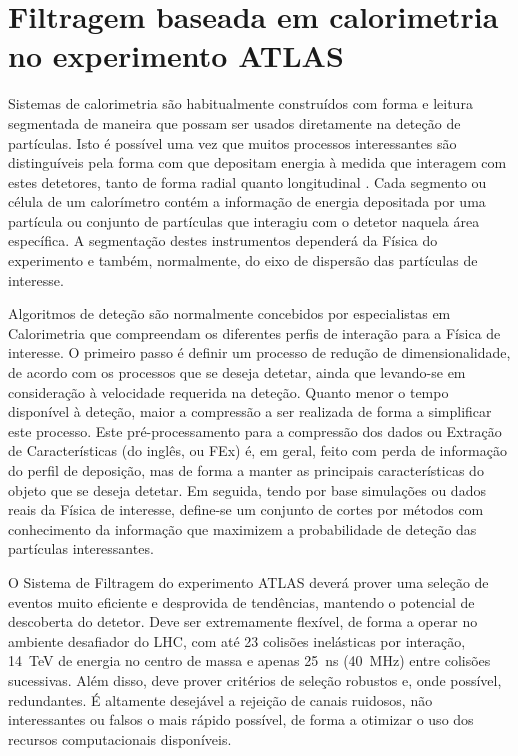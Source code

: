 \typeout{ ====================================================================}
\typeout{ ====================================================================}

\chapter{Filtragem baseada em calorimetria no experimento ATLAS}
\label{chap:baseline}

Sistemas de calorimetria são habitualmente construídos com forma e leitura
segmentada de maneira que possam ser usados diretamente na dete\-ção de
par\-tí\-culas. Isto é possível uma vez que muitos processos interessantes são
distinguíveis pela forma com que depositam energia à medida que interagem com
estes detetores, tanto de forma radial quanto longitudinal
\cite{wigmans-book}. Cada segmento ou célula de um calorímetro contém a
informação de energia depositada por uma par\-tí\-cula ou conjunto de
par\-tí\-culas que interagiu com o detetor naquela área espe\-cí\-fica. A
seg\-men\-ta\-ção destes instrumentos dependerá da Física do experimento e
também, normalmente, do eixo de dispersão das partículas de interesse.

Algoritmos de dete\-ção são normalmente concebidos por especialistas em
Calorimetria que compreendam os diferentes perfis de intera\-ção para a
Fí\-sica de interesse. O primeiro passo é definir um processo de redu\-ção de
dimensionalidade, de acordo com os processos que se deseja detetar, ainda que
levando-se em consideração à velocidade requerida na deteção. Quanto menor o
tempo disponível à deteção, maior a compressão a ser realizada de forma a
simplificar este processo. Este pré-processamento para a compressão dos dados
ou Extração de Características (do inglês,  ou FEx) é,
em geral, feito com perda de informação do perfil de deposição, mas de forma a
manter as principais características do objeto que se deseja detetar. Em
seguida, tendo por base simulações ou dados reais da Física de interesse,
define-se um conjunto de cortes por métodos com conhecimento da informação
 que maximizem a probabilidade de deteção das partículas
interessantes.

O Sistema de Filtragem  do experimento ATLAS deverá prover uma
seleção de eventos muito eficiente e desprovida de tendências, mantendo o
potencial de descoberta do detetor. Deve ser extremamente flexível, de forma a
operar no ambiente desafiador do LHC, com até 23 colisões inelásticas por
interação, 14~TeV de energia no centro de massa e apenas 25~ns (40~MHz) entre
colisões sucessivas. Além disso, deve prover critérios de seleção robustos e,
onde possível, redundantes. É altamente desejável a rejeição de canais
ruidosos, não interessantes ou falsos o mais rápido possível, de forma a
otimizar o uso dos recursos computacionais disponíveis.

